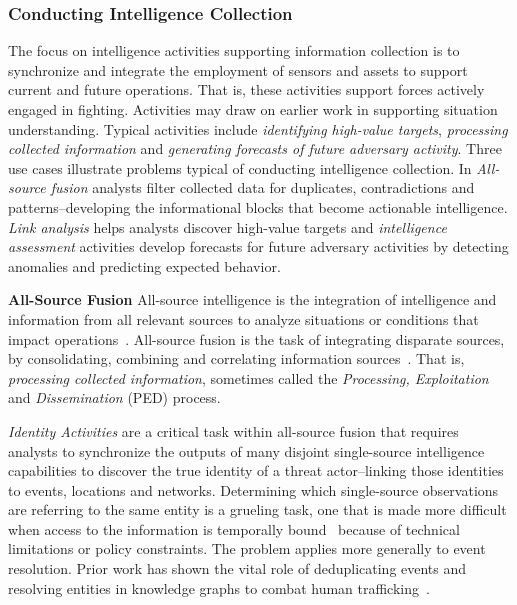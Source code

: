\subsubsection{Conducting Intelligence Collection}
\label{section:Conducting-Intelligence-Collection}
The focus on intelligence activities supporting information collection is to synchronize and integrate the employment of sensors and assets to support current and future operations. 
That is, these activities support forces actively engaged in fighting.
Activities may draw on earlier work in supporting situation understanding.
Typical activities include \textit{identifying high-value targets}, \textit{processing collected information} and \textit{generating forecasts of future adversary activity}.
Three use cases illustrate problems typical of conducting intelligence collection. 
In \textit{All-source fusion} analysts filter collected data for duplicates, contradictions and patterns--developing the informational blocks that become actionable intelligence.
\textit{Link analysis} helps analysts discover high-value targets and \textit{intelligence assessment} activities develop forecasts for future adversary activities by detecting anomalies and predicting expected behavior.

\textbf{All-Source Fusion}
All-source intelligence is the integration of intelligence and information from all relevant sources to analyze situations or conditions that impact operations~\cite{Army2019}.
All-source fusion is the task of integrating disparate sources, by consolidating, combining and correlating information sources~\cite{Army2019}.
That is, \textit{processing collected information}, sometimes called the \textit{Processing, Exploitation} and \textit{Dissemination} (PED) process.

\textit{Identity Activities} are a critical task within all-source fusion that requires analysts to synchronize the outputs of many disjoint single-source intelligence capabilities to discover the true identity of a threat actor--linking those identities to events, locations and networks. 
Determining which single-source observations are referring to the same entity is a grueling task, one that is made more difficult when access to the information is temporally bound~\cite{Regli2022a} because of technical limitations or policy constraints. 
The problem applies more generally to event resolution.
Prior work has shown the vital role of deduplicating events and resolving entities in knowledge graphs to combat human trafficking~\cite{Szekely2015}.


